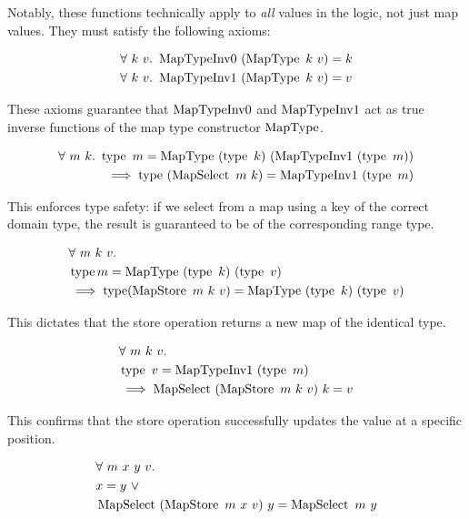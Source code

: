 \documentclass[11pt]{article}
\begin{document}
Notably, these functions technically apply to \emph{all} values in the logic, not just map values.
They must satisfy the following axioms:

\begin{align*}
  & \forall\ k\ v.\ \operatorname{MapTypeInv0}\ (\operatorname{MapType}\ k\ v) = k\\
  & \forall\ k\ v.\ \operatorname{MapTypeInv1}\ (\operatorname{MapType}\ k\ v) = v
\end{align*}

These axioms guarantee that $\operatorname{MapTypeInv0}$ and $\operatorname{MapTypeInv1}$ act as true inverse functions of the map type constructor $\operatorname{MapType}$.

\begin{equation}
  \label{ax:map-select-typesafe}
  \begin{aligned}
    \forall \ m \ k. \ 
    \type \ m = \MapType \ (\type \ k) \ (\MapTypeInvV \ (\type \ m)) \\
    \implies  \type \ (\Select \ m \ k) = \MapTypeInvV \ (\type \ m)
  \end{aligned}
\end{equation}

This enforces type safety: if we select from a map using a key of the correct domain type,
the result is guaranteed to be of the corresponding range type.

\begin{align*}
  &\forall \ m \ k \ v. \\
  &\type m = \MapType\ (\type\ k)\ (\type\ v) \\
  &\implies  \type(\Store\ m\ k\ v) = \MapType\ (\type\ k)\ (\type\ v)
\end{align*}

This dictates that the store operation returns a new map of the identical type.

\begin{equation}
  \label{ax:map-update-strong}
  \begin{aligned}
    &\forall \ m \ k \ v.\\
    &\operatorname{type}\ v = \operatorname{MapTypeInv1}\ (\operatorname{type}\ m) \\
    &\implies  \operatorname{MapSelect}\ (\operatorname{MapStore}\ m\ k\ v)\ k = v
  \end{aligned}
\end{equation}

This confirms that the store operation successfully updates the value at a specific position.

\begin{align*}
  &\forall \ m \ x \ y \ v.\\
  &x = y \ \vee \\
  &\operatorname{MapSelect}\ (\operatorname{MapStore}\ m\ x\ v)\ y = \operatorname{MapSelect}\ m\ y
\end{align*}
\end{document}

